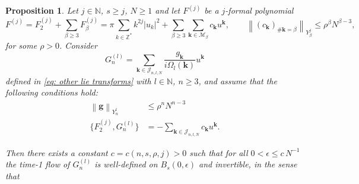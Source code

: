 \documentclass[a4paper,10pt,reqno]{article}
\theoremstyle{definition}
\theoremstyle{plain}
\theoremstyle{plain}
\theoremstyle{definition}
\theoremstyle{plain}
\theoremstyle{plain}
\newtheorem{prop}[definition]{Proposition}
\theoremstyle{plain}
\theoremstyle{definition}
\theoremstyle{definition}
\newcommand{\norm}[1]{\left\lVert #1 \right\rVert}
\def \N{\mathbb N}
\def \Z{\mathbb Z}
\def \M{\mathcal{M}}
\def \J{\mathcal{J}}
\def \k{\bm{k}}
\begin{document}
\begin{prop} \label{conv taylor series}
Let $j \in \N$, $s \ge j$, $N \ge 1$ and let $F^{(j)}$ be a $j$-formal polynomial
\begin{equation} \label{formula Fj prop}
F^{(j)} = F_2^{(j)} + \sum_{\beta \ge 3} F_{\beta}^{(j)} = \pi \sum_{k \in \Z^*} k^{2j} |u_k|^2 + \sum_{\beta \ge 3} \sum_{\k \in \M_{\beta}} c_{\k} u^{\k}, \qquad \norm{(c_{\k})_{\#\k = \beta}}_{Y^{j}_{\beta}} \le \rho^{\beta} N^{\beta-3},
\end{equation}
for some $\rho > 0$.
Consider 
\[
G_n^{(l)} = \sum_{\k \in \J_{n,l,N}} \frac{g_{\k}}{i \Omega_l(\k)} u^{\k}
\]
defined in \eqref{eq: other lie transforms} with $l \in \N$, $n \ge 3$,  and assume that the following conditions hold: 
\begin{align} 
\norm{\bm{g}}_{Y_n^{l}} & \le \rho^n N^{n-3}\label{eq: stima induttiva coeff g} \\ 
\{ F_2^{(j)} , G_n^{(l)} \} & = - \sum_{\k \in \J_{n,l,N}} c_{\k} u^{\k}. \label{hom_eq prop}
\end{align}

Then there exists a constant $c=c(n,s,\rho,j)>0$ such that for all $0<\epsilon\leq c\, N^{-1}$ the time-1 flow of $G_n^{(l)}$ is well-defined on $B_s(0,\epsilon)$ and invertible, in the sense that



\end{prop}
\end{document}
